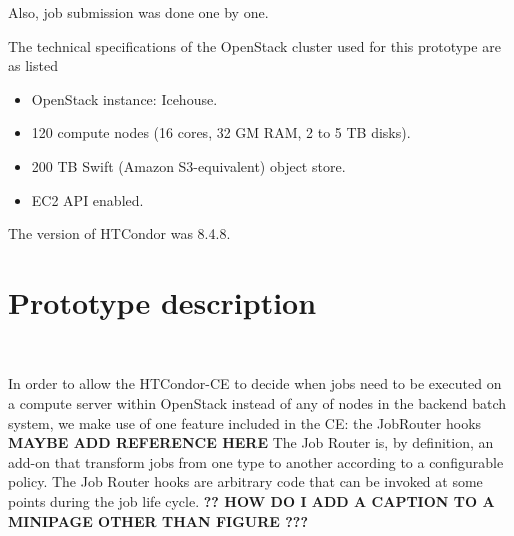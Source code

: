 \documentclass[a4paper]{jpconf}
\begin{document}
Also, job submission was done one by one.

The technical specifications of the OpenStack cluster used for this prototype are as listed 

\begin{itemize}
\item OpenStack instance: Icehouse.
\item 120 compute nodes (16 cores, 32 GM RAM, 2 to 5 TB disks).
\item 200 TB Swift (Amazon S3-equivalent) object store.
\item EC2 API enabled.
\end{itemize}

The version of HTCondor was 8.4.8.

\section{Prototype description}

~

In order to allow the HTCondor-CE to decide when jobs need to be executed on a
compute server within OpenStack instead of any of nodes in the backend batch
system, we make use of one feature included in the CE: the JobRouter hooks \textbf{MAYBE ADD REFERENCE HERE} \newline
The Job Router is, by definition, an add-on that transform jobs from one type to
another according to a configurable policy.
The Job Router hooks are arbitrary code that can be invoked at some points during the job life cycle.
\newline \textbf{?? HOW DO I ADD A CAPTION TO A MINIPAGE OTHER THAN FIGURE ???}

\end{document}

